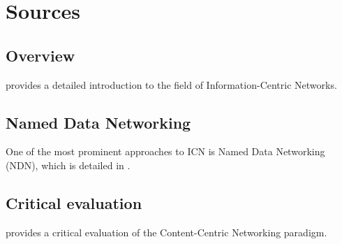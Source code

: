 \documentclass[twoside,a4paper]{article}
\title{\papertitle}
\affiliation{
\paperauthorA}
{\href{http://www.haw-hamburg.de/ti-i}{Hamburg University of Applied Sciences,
    Dept. Computer Science,} \\ Berliner Tor 7\\ 20099 Hamburg, Germany\\
{\ttfamily \href{mailto:lotte.steenbrink@haw-hamburg.de}{lotte.steenbrink@haw-hamburg.de}}
}
\newif\ifpdf
\begin{document}
\ifpdf %
  \DeclareGraphicsExtensions{.png,.jpg,.pdf}
\else  %
\fi

\maketitle

\begin{abstract}
Content-Centric Networking (CCN) presents a paradigm shift in internet technologies: Instead of thinking about data lying at addresses, CCN works with data \emph{directly}. Nodes retrieve data by directly asking the network for it, and let the underlying protocols figure out the rest. This allows for location-independent data storage and caching throughout the entire network, improving latencies, reducing network load, and even enabling the network to cope with partitioning without losing all the data. CCN was designed with the cabled Internet in mind, but may also be a promising approach for the Internet of Things. My Homework would explore recent developments in CCN research and their applicability to the IoT.
\end{abstract}

\section{Sources}
\label{sec:src}

\subsection{Overview}
\label{sec:subsec_overview}
\cite{ICN_survey} provides a detailed introduction to the field of Information-Centric Networks.

\subsection{Named Data Networking}
\label{sec:subsec_advances}
One of the most prominent approaches to ICN is Named Data Networking (NDN), which is detailed in \cite{394}.

\subsection{Critical evaluation}
\label{sec:subsec_advances}
\cite{Perino:2011:RCC:2018584.2018596} provides a critical evaluation of the Content-Centric Networking paradigm.

\newpage
\nocite{*}

\end{document}
